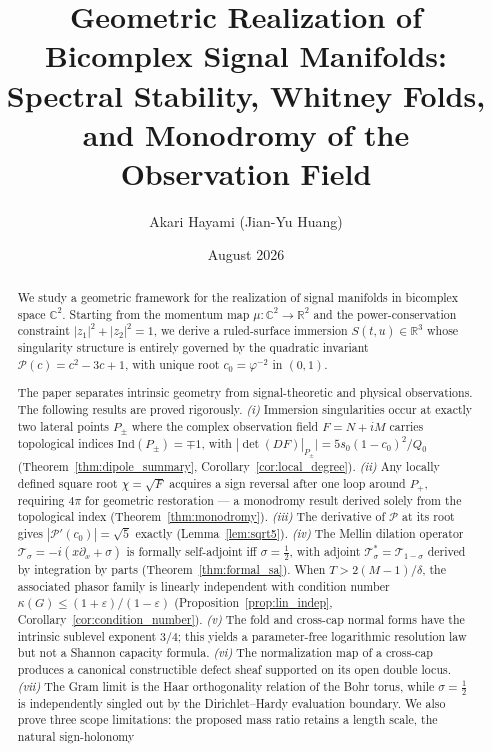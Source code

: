 \documentclass[11pt]{article}
\title{Geometric Realization of Bicomplex Signal Manifolds:\\
       Spectral Stability, Whitney Folds, and Monodromy of the Observation Field}
\author{Akari Hayami (Jian-Yu Huang)}
\date{August 2026}
\begin{document}
\maketitle

\begin{abstract}
We study a geometric framework for the realization of signal manifolds in
bicomplex space $\mathbb{C}^2$.  Starting from the momentum map
$\mu:\mathbb{C}^2\to\mathbb{R}^2$ and the power-conservation constraint
$|z_1|^2+|z_2|^2=1$, we derive a ruled-surface immersion $S(t,u)\in\mathbb{R}^3$
whose singularity structure is entirely governed by the quadratic invariant
$\mathcal{P}(c)=c^2-3c+1$, with unique root $c_0=\varphi^{-2}$ in $(0,1)$.

The paper separates intrinsic geometry from signal-theoretic and physical
observations.  The following results are proved rigorously.
\emph{(i)} Immersion singularities occur at exactly two lateral points $P_\pm$
where the complex observation field $F=N+iM$ carries topological indices
$\mathrm{Ind}(P_\pm)=\mp1$, with $|\det(DF)|_{P_\pm}|=5s_0(1-c_0)^2/Q_0$
(Theorem~\ref{thm:dipole_summary}, Corollary~\ref{cor:local_degree}).
\emph{(ii)} Any locally defined square root $\chi=\sqrt{F}$ acquires a sign
reversal after one loop around $P_+$, requiring $4\pi$ for geometric restoration
--- a monodromy result derived solely from the topological index
(Theorem~\ref{thm:monodromy}).
\emph{(iii)} The derivative of $\mathcal{P}$ at its root gives
$|\mathcal{P}'(c_0)|=\sqrt{5}$ exactly (Lemma~\ref{lem:sqrt5}).
\emph{(iv)} The Mellin dilation operator $\mathcal{T}_\sigma=-i(x\partial_x+\sigma)$
is formally self-adjoint iff $\sigma=\tfrac12$, with adjoint
$\mathcal{T}_\sigma^*=\mathcal{T}_{1-\sigma}$ derived by integration by parts
(Theorem~\ref{thm:formal_sa}).  When $T>2(M-1)/\delta$, the associated phasor
family is linearly independent with condition number
$\kappa(G)\le(1+\varepsilon)/(1-\varepsilon)$
(Proposition~\ref{prop:lin_indep}, Corollary~\ref{cor:condition_number}).
\emph{(v)} The fold and cross-cap normal forms have the intrinsic sublevel
exponent $3/4$; this yields a parameter-free logarithmic resolution law but not
a Shannon capacity formula.  \emph{(vi)} The normalization map of a cross-cap
produces a canonical constructible defect sheaf supported on its open double
locus.  \emph{(vii)} The Gram limit is the Haar orthogonality relation of the
Bohr torus, while $\sigma=\tfrac12$ is independently singled out by the
Dirichlet--Hardy evaluation boundary.  We also prove three scope limitations:
the proposed mass ratio retains a length scale, the natural sign-holonomy

\end{abstract}
\end{document}
